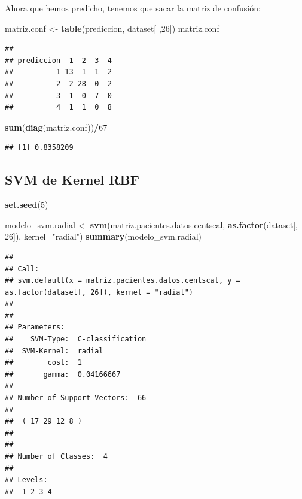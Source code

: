 \documentclass[]{article}
\newenvironment{Shaded}{\begin{snugshade}}{\end{snugshade}}
\newcommand{\KeywordTok}[1]{\textcolor[rgb]{0.13,0.29,0.53}{\textbf{#1}}}
\newcommand{\DataTypeTok}[1]{\textcolor[rgb]{0.13,0.29,0.53}{#1}}
\newcommand{\DecValTok}[1]{\textcolor[rgb]{0.00,0.00,0.81}{#1}}
\newcommand{\StringTok}[1]{\textcolor[rgb]{0.31,0.60,0.02}{#1}}
\newcommand{\OperatorTok}[1]{\textcolor[rgb]{0.81,0.36,0.00}{\textbf{#1}}}
\newcommand{\NormalTok}[1]{#1}
\begin{document}
Ahora que hemos predicho, tenemos que sacar la matriz de confusión:

\begin{Shaded}
\begin{Highlighting}[]
\NormalTok{matriz.conf <-}\StringTok{ }\KeywordTok{table}\NormalTok{(prediccion, dataset[ ,}\DecValTok{26}\NormalTok{])}
\NormalTok{matriz.conf}
\end{Highlighting}
\end{Shaded}

\begin{verbatim}
##           
## prediccion  1  2  3  4
##          1 13  1  1  2
##          2  2 28  0  2
##          3  1  0  7  0
##          4  1  1  0  8
\end{verbatim}

\begin{Shaded}
\begin{Highlighting}[]
\KeywordTok{sum}\NormalTok{(}\KeywordTok{diag}\NormalTok{(matriz.conf))}\OperatorTok{/}\DecValTok{67}
\end{Highlighting}
\end{Shaded}

\begin{verbatim}
## [1] 0.8358209
\end{verbatim}

\subsection{SVM de Kernel RBF}\label{svm-de-kernel-rbf}

\begin{Shaded}
\begin{Highlighting}[]
\KeywordTok{set.seed}\NormalTok{(}\DecValTok{5}\NormalTok{)}

\NormalTok{modelo_svm.radial <-}\StringTok{ }\KeywordTok{svm}\NormalTok{(matriz.pacientes.datos.centscal, }\KeywordTok{as.factor}\NormalTok{(dataset[, }\DecValTok{26}\NormalTok{]), }\DataTypeTok{kernel=}\StringTok{"radial"}\NormalTok{)}
\KeywordTok{summary}\NormalTok{(modelo_svm.radial)}
\end{Highlighting}
\end{Shaded}

\begin{verbatim}
## 
## Call:
## svm.default(x = matriz.pacientes.datos.centscal, y = as.factor(dataset[, 26]), kernel = "radial")
## 
## 
## Parameters:
##    SVM-Type:  C-classification 
##  SVM-Kernel:  radial 
##        cost:  1 
##       gamma:  0.04166667 
## 
## Number of Support Vectors:  66
## 
##  ( 17 29 12 8 )
## 
## 
## Number of Classes:  4 
## 
## Levels: 
##  1 2 3 4
\end{verbatim}
\end{document}
